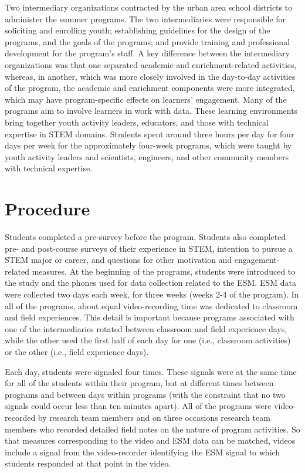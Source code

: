 \documentclass[]{msu-thesis}
\theoremstyle{definition}
\theoremstyle{definition}
\theoremstyle{definition}
\theoremstyle{remark}
\begin{document}
Two intermediary organizations contracted by the urban area school
districts to administer the summer programs. The two intermediaries were
responsible for soliciting and enrolling youth; establishing guidelines
for the design of the programs, and the goals of the programs; and
provide training and professional development for the program's staff. A
key difference between the intermediary organizations was that one
separated academic and enrichment-related activities, whereas, in
another, which was more closely involved in the day-to-day activities of
the program, the academic and enrichment components were more
integrated, which may have program-specific effects on learners'
engagement. Many of the programs aim to involve learners in work with
data. These learning environments bring together youth activity leaders,
educators, and those with technical expertise in STEM domains. Students
spent around three hours per day for four days per week for the
approximately four-week programs, which were taught by youth activity
leaders and scientists, engineers, and other community members with
technical expertise.

\section{Procedure}\label{procedure}

Students completed a pre-survey before the program. Students also
completed pre- and post-course surveys of their experience in STEM,
intention to pursue a STEM major or career, and questions for other
motivation and engagement-related measures. At the beginning of the
programs, students were introduced to the study and the phones used for
data collection related to the ESM. ESM data were collected two days
each week, for three weeks (weeks 2-4 of the program). In all of the
programs, about equal video-recording time was dedicated to classroom
and field experiences. This detail is important because programs
associated with one of the intermediaries rotated between classroom and
field experience days, while the other used the first half of each day
for one (i.e., classroom activities) or the other (i.e., field
experience days).

Each day, students were signaled four times. These signals were at the
same time for all of the students within their program, but at different
times between programs and between days within programs (with the
constraint that no two signals could occur less than ten minutes apart).
All of the programs were video-recorded by research team members and on
three occasions research team members who recorded detailed field notes
on the nature of program activities. So that measures corresponding to
the video and ESM data can be matched, videos include a signal from the
video-recorder identifying the ESM signal to which students responded at
that point in the video.
\end{document}
